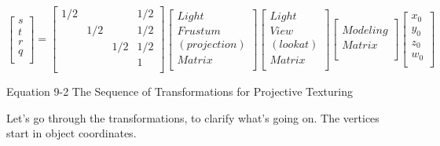 \documentclass[../main.tex]{subfiles}
\begin{document}
\FloatBarrier
\begin{equationcaption}
$
\begin{bmatrix} s \\ t \\ r \\ q \\ \end{bmatrix}
=
\begin{bmatrix} 1/2 & & & 1/2 \\ & 1/2 & & 1/2 \\ & & 1/2 & 1/2 \\ & & & 1 \\ \end{bmatrix}
\begin{bmatrix} Light \\ Frustum \\ (projection) \\ Matrix \\ \end{bmatrix}
\begin{bmatrix} Light \\ View \\ (look at) \\ Matrix \\ \end{bmatrix}
\begin{bmatrix}  \\ Modeling \\ Matrix \\  \\ \end{bmatrix}
\begin{bmatrix} x_0 \\ y_0 \\ z_0 \\ w_0 \\ \end{bmatrix}
$
\caption{Equation 9-2 The Sequence of Transformations for Projective Texturing}
\end{equationcaption}
\FloatBarrier

Let's go through the transformations, to clarify what's going on. The vertices start in object coordinates.
\end{document}
